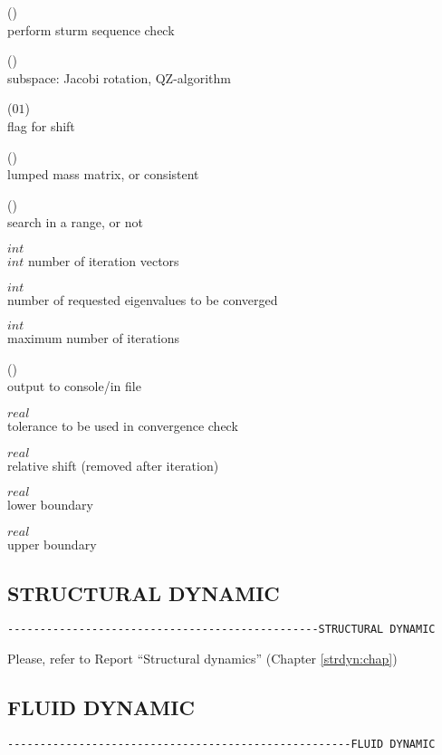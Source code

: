  (\kor{})\\
perform sturm sequence check

 (\kor{})\\
subspace: Jacobi rotation,  QZ-algorithm

 ($0$\kor$1$)\\
flag for shift

 (\kor{})\\
lumped mass matrix,  or consistent

 (\kor{})\\     
search in a range, or not

 $int$\\
$int$ number of iteration vectors

 $int$\\
number of requested eigenvalues to be converged

 $int$\\
maximum number of iterations

 (\kor{}\kor{})\\
output to console/in file

 $real$\\
tolerance to be used in convergence check

 $real$\\
relative shift (removed after iteration)

 $real$\\
lower boundary 

 $real$\\
upper boundary  


\subsection{STRUCTURAL DYNAMIC}
\begin{verbatim}
------------------------------------------------STRUCTURAL DYNAMIC
\end{verbatim}

Please, refer to Report ``Structural dynamics'' (Chapter \ref{strdyn:chap})




\subsection{FLUID DYNAMIC}
\begin{verbatim}
-----------------------------------------------------FLUID DYNAMIC
\end{verbatim}
